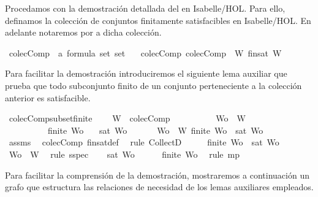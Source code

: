 \begin{isabellebody}
\begin{isamarkuptext}
  Procedamos con la demostración detallada del  en Isabelle/HOL. Para ello, 
  definamos la colección de conjuntos finitamente satisfacibles en Isabelle/HOL. En adelante
  notaremos por  a dicha colección.%
\end{isamarkuptext}\isamarkuptrue%
\isamarkupfalse%
\ colecComp\ {\isacharcolon}{\isacharcolon}\ {\isachardoublequoteopen}{\isacharparenleft}{\isacharprime}a\ formula\ set{\isacharparenright}\ set{\isachardoublequoteclose}\isanewline
\ \ \ colecComp{\isacharcolon}\ {\isachardoublequoteopen}colecComp\ {\isacharequal}\ {\isacharbraceleft}W{\isachardot}\ fin{\isacharunderscore}sat\ W{\isacharbraceright}{\isachardoublequoteclose}%
\begin{isamarkuptext}%
Para facilitar la demostración introduciremos el siguiente lema auxiliar que prueba que
  todo subconjunto finito de un conjunto perteneciente a la colección anterior es satisfacible.%
\end{isamarkuptext}\isamarkuptrue%
\isamarkupfalse%
\ colecComp{\isacharunderscore}subset{\isacharunderscore}finite{\isacharcolon}\ \isanewline
\ \ \ {\isachardoublequoteopen}W\ {\isasymin}\ colecComp{\isachardoublequoteclose}\isanewline
\ \ \ \ \ \ \ \ \ \ {\isachardoublequoteopen}Wo\ {\isasymsubseteq}\ W{\isachardoublequoteclose}\isanewline
\ \ \ \ \ \ \ \ \ \ {\isachardoublequoteopen}finite\ Wo{\isachardoublequoteclose}\isanewline
\ \ \ {\isachardoublequoteopen}sat\ Wo{\isachardoublequoteclose}\ \isanewline
%
\isadelimproof
%
\endisadelimproof
%
\isatagproof
{}\isamarkupfalse%
\ {\isacharminus}\isanewline
\ \ \isamarkupfalse%
\ {\isachardoublequoteopen}{\isasymforall}Wo\ {\isasymsubseteq}\ W{\isachardot}\ finite\ Wo\ {\isasymlongrightarrow}\ sat\ Wo{\isachardoublequoteclose}\isanewline
\ \ \ \ \isamarkupfalse%
\ assms{\isacharparenleft}{}{\isacharparenright}\ \isamarkupfalse%
\ colecComp\ fin{\isacharunderscore}sat{\isacharunderscore}def\ \isamarkupfalse%
\ {\isacharparenleft}rule\ CollectD{\isacharparenright}\isanewline
\ \ \isamarkupfalse%
\ \isamarkupfalse%
\ {\isachardoublequoteopen}finite\ Wo\ {\isasymlongrightarrow}\ sat\ Wo{\isachardoublequoteclose}\isanewline
\ \ \ \ \isamarkupfalse%
\ {\isacartoucheopen}Wo\ {\isasymsubseteq}\ W{\isacartoucheclose}\ \isamarkupfalse%
\ {\isacharparenleft}rule\ sspec{\isacharparenright}\isanewline
\ \ \isamarkupfalse%
\ {\isachardoublequoteopen}sat\ Wo{\isachardoublequoteclose}\isanewline
\ \ \ \ \isamarkupfalse%
\ {\isacartoucheopen}finite\ Wo{\isacartoucheclose}\ \isamarkupfalse%
\ {\isacharparenleft}rule\ mp{\isacharparenright}\isanewline
{}\isamarkupfalse%
%
\endisatagproof
{\isafoldproof}%
%
\isadelimproof
%
\endisadelimproof
%
\begin{isamarkuptext}%
Para facilitar la comprensión de la demostración, mostraremos a continuación un grafo que 
  estructura las relaciones de necesidad de los lemas auxiliares empleados.


\end{isamarkuptext}
\end{isabellebody}
